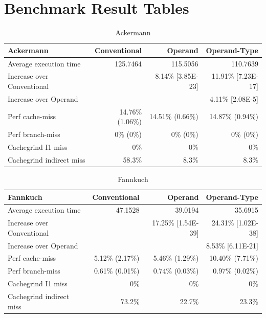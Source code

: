 \documentclass[english,a4paper,12pt]{report}
\begin{document}
\section{Benchmark Result Tables}
\begin{table}[!htb]
  \begin{center}
    \begin{tabular}{lrrr}
      Ackermann & Conventional & Operand & Operand-Type\\
      \hline
      Average execution time & 125.7464 & 115.5056 & 110.7639\\
      Increase over Conventional &  & 8.14\% [3.85E-23] & 11.91\% [7.23E-17]\\
      Increase over Operand &  &  & 4.11\% [2.08E-5]\\
      Perf cache-miss & 14.76\% (1.06\%) & 14.51\% (0.66\%) & 14.87\% (0.94\%)\\
      Perf branch-miss & 0\% (0\%) & 0\% (0\%) & 0\% (0\%)\\
      Cachegrind I1 miss & 0\% & 0\% & 0\%\\
      Cachegrind indirect miss & 58.3\% & 8.3\% & 8.3\%\\
    \end{tabular}
  \end{center}
  \caption{Ackermann}
\end{table}

\begin{table}[!htb]
  \begin{center}
    \begin{tabular}{lrrr}
      Fannkuch & Conventional & Operand & Operand-Type\\
      \hline
      Average execution time & 47.1528 & 39.0194 & 35.6915\\
      Increase over Conventional &  & 17.25\% [1.54E-39] & 24.31\% [1.02E-38]\\
      Increase over Operand &  &  & 8.53\% [6.11E-21]\\
      Perf cache-miss & 5.12\% (2.17\%) & 5.46\% (1.29\%) & 10.40\% (7.71\%)\\
      Perf branch-miss & 0.61\% (0.01\%) & 0.74\% (0.03\%) & 0.97\% (0.02\%)\\
      Cachegrind I1 miss & 0\% & 0\% & 0\%\\
      Cachegrind indirect miss & 73.2\% & 22.7\% & 23.3\%\\
    \end{tabular}
  \end{center}
  \caption{Fannkuch}
\end{table}
\end{document}
